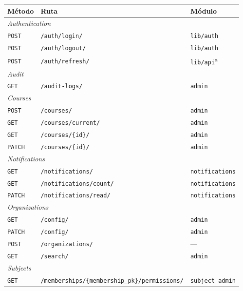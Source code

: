 \begin{table}[htbp]
  \centering
  \footnotesize
  \begin{tabular}{llp{3.6cm}}
    \toprule
    \textbf{Método} & \textbf{Ruta} & \textbf{Módulo} \\
    \midrule
    \multicolumn{3}{l}{\textit{Authentication}} \\
    \texttt{POST} & \texttt{/auth/login/} & \texttt{lib/auth} \\
    \texttt{POST} & \texttt{/auth/logout/} & \texttt{lib/auth} \\
    \texttt{POST} & \texttt{/auth/refresh/} & \texttt{lib/api}\textsuperscript{a} \\
    \midrule
    \multicolumn{3}{l}{\textit{Audit}} \\
    \texttt{GET} & \texttt{/audit-logs/} & \texttt{admin} \\
    \midrule
    \multicolumn{3}{l}{\textit{Courses}} \\
    \texttt{POST} & \texttt{/courses/} & \texttt{admin} \\
    \texttt{GET} & \texttt{/courses/current/} & \texttt{admin} \\
    \texttt{GET} & \texttt{/courses/\{id\}/} & \texttt{admin} \\
    \texttt{PATCH} & \texttt{/courses/\{id\}/} & \texttt{admin} \\
    \midrule
    \multicolumn{3}{l}{\textit{Notifications}} \\
    \texttt{GET} & \texttt{/notifications/} & \texttt{notifications} \\
    \texttt{GET} & \texttt{/notifications/count/} & \texttt{notifications} \\
    \texttt{PATCH} & \texttt{/notifications/read/} & \texttt{notifications} \\
    \midrule
    \multicolumn{3}{l}{\textit{Organizations}} \\
    \texttt{GET} & \texttt{/config/} & \texttt{admin} \\
    \texttt{PATCH} & \texttt{/config/} & \texttt{admin} \\
    \texttt{POST} & \texttt{/organizations/} & --- \\
    \texttt{GET} & \texttt{/search/} & \texttt{admin} \\
    \midrule
    \multicolumn{3}{l}{\textit{Subjects}} \\
    \texttt{GET} & \texttt{/memberships/\{membership\_pk\}/permissions/} & \texttt{subject-admin} \\

\end{tabular}
\end{table}
